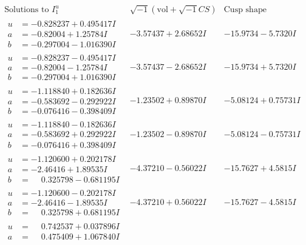 \documentclass[1p]{elsarticle_modified}
\theoremstyle{definition}
\newcommand{\I}{\sqrt{-1}}
\begin{document}
$$\begin{array}{c|c|c}  
\text{Solutions to }I^u_{1}& \I (\text{vol} + \sqrt{-1}CS) & \text{Cusp shape}\\
 \hline 
\begin{aligned}
u &= -0.828237 + 0.495417 I \\
a &= -0.82004 + 1.25784 I \\
b &= -0.297004 - 1.016390 I\end{aligned}
 & -3.57437 + 2.68652 I & -15.9734 - 5.7320 I \\ \hline\begin{aligned}
u &= -0.828237 - 0.495417 I \\
a &= -0.82004 - 1.25784 I \\
b &= -0.297004 + 1.016390 I\end{aligned}
 & -3.57437 - 2.68652 I & -15.9734 + 5.7320 I \\ \hline\begin{aligned}
u &= -1.118840 + 0.182636 I \\
a &= -0.583692 - 0.292922 I \\
b &= -0.076416 - 0.398409 I\end{aligned}
 & -1.23502 + 0.89870 I & -5.08124 + 0.75731 I \\ \hline\begin{aligned}
u &= -1.118840 - 0.182636 I \\
a &= -0.583692 + 0.292922 I \\
b &= -0.076416 + 0.398409 I\end{aligned}
 & -1.23502 - 0.89870 I & -5.08124 - 0.75731 I \\ \hline\begin{aligned}
u &= -1.120600 + 0.202178 I \\
a &= -2.46416 + 1.89535 I \\
b &= \phantom{-}0.325798 - 0.681195 I\end{aligned}
 & -4.37210 - 0.56022 I & -15.7627 + 4.5815 I \\ \hline\begin{aligned}
u &= -1.120600 - 0.202178 I \\
a &= -2.46416 - 1.89535 I \\
b &= \phantom{-}0.325798 + 0.681195 I\end{aligned}
 & -4.37210 + 0.56022 I & -15.7627 - 4.5815 I \\ \hline\begin{aligned}
u &= \phantom{-}0.742537 + 0.037896 I \\
a &= \phantom{-}0.475409 + 1.067840 I \\

\end{aligned}
\end{array}$$
\end{document}
